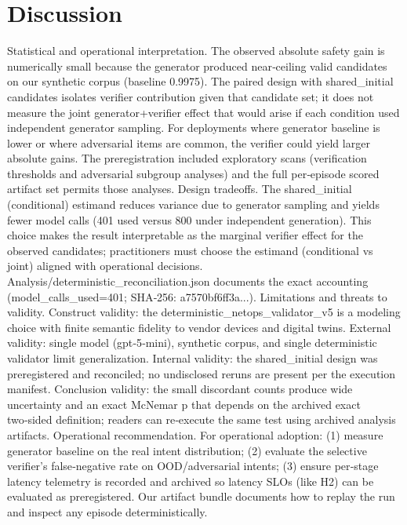 \documentclass[conference]{IEEEtran}
\begin{document}
\section{Discussion}
Statistical and operational interpretation. The observed absolute safety gain is numerically small because the generator produced near‑ceiling valid candidates on our synthetic corpus (baseline 0.9975). The paired design with shared\_initial candidates isolates verifier contribution given that candidate set; it does not measure the joint generator+verifier effect that would arise if each condition used independent generator sampling. For deployments where generator baseline is lower or where adversarial items are common, the verifier could yield larger absolute gains. The preregistration included exploratory scans (verification thresholds and adversarial subgroup analyses) and the full per‑episode scored artifact set permits those analyses.
Design tradeoffs. The shared\_initial (conditional) estimand reduces variance due to generator sampling and yields fewer model calls (401 used versus 800 under independent generation). This choice makes the result interpretable as the marginal verifier effect for the observed candidates; practitioners must choose the estimand (conditional vs joint) aligned with operational decisions. Analysis/deterministic\_reconciliation.json documents the exact accounting (model\_calls\_used=401; SHA‑256: a7570bf6ff3a...).
Limitations and threats to validity. Construct validity: the deterministic\_netops\_validator\_v5 is a modeling choice with finite semantic fidelity to vendor devices and digital twins. External validity: single model (gpt‑5‑mini), synthetic corpus, and single deterministic validator limit generalization. Internal validity: the shared\_initial design was preregistered and reconciled; no undisclosed reruns are present per the execution manifest. Conclusion validity: the small discordant counts produce wide uncertainty and an exact McNemar p that depends on the archived exact two‑sided definition; readers can re‑execute the same test using archived analysis artifacts.
Operational recommendation. For operational adoption: (1) measure generator baseline on the real intent distribution; (2) evaluate the selective verifier's false‑negative rate on OOD/adversarial intents; (3) ensure per‑stage latency telemetry is recorded and archived so latency SLOs (like H2) can be evaluated as preregistered. Our artifact bundle documents how to replay the run and inspect any episode deterministically.
\end{document}
